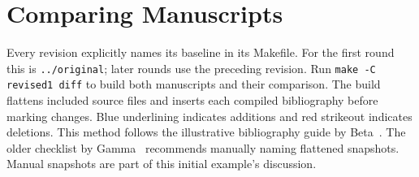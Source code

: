 \section{Comparing Manuscripts}
Every revision explicitly names its baseline in its Makefile.
For the first round this is \texttt{../original}; later rounds use the preceding revision.
Run \texttt{make -C revised1 diff} to build both manuscripts and their comparison.
The build flattens included source files and inserts each compiled bibliography
before marking changes. Blue underlining indicates additions and red strikeout indicates deletions.
This method follows the illustrative bibliography guide by Beta~\cite{bibliography}.
The older checklist by Gamma~\cite{legacy} recommends manually naming flattened snapshots.
Manual snapshots are part of this initial example's discussion.
